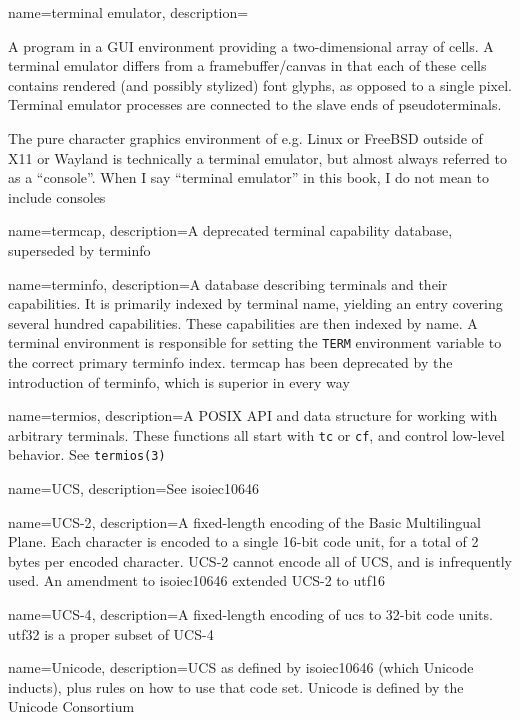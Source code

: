 {
  name={terminal emulator},
description={A program in a GUI environment providing a
  two-dimensional array of cells. A terminal emulator differs from a
  framebuffer/canvas in that each of these cells contains rendered (and
  possibly stylized) font glyphs, as opposed to a single pixel. Terminal
  emulator processes are connected to the slave ends of pseudoterminals.

 The pure character graphics environment of e.g. Linux or FreeBSD outside
  of X11 or Wayland is technically a terminal emulator, but almost always
  referred to as a ``console''. When I say ``terminal emulator'' in this book,
  I do not mean to include consoles}
}

{
  name={termcap},
description={A deprecated terminal capability database, superseded by \gls{terminfo}}
}

{
  name={terminfo},
description={A database describing terminals and their capabilities. It is
  primarily indexed by terminal name, yielding an entry covering several
  hundred capabilities. These capabilities are then indexed by name. A
  terminal environment is responsible for setting the \texttt{TERM} environment
  variable to the correct primary terminfo index. termcap has been
  deprecated by the introduction of terminfo, which is superior in every way}
}

{
  name={termios},
description={A POSIX API and data structure for working with arbitrary terminals.
  These functions all start with \texttt{tc} or \texttt{cf}, and control
  low-level behavior. See \texttt{termios(3)}\cite{termios}}
}

{
  name={UCS},
  description={See \Gls{isoiec10646}}
}

{
  name={UCS-2},
description={A fixed-length encoding of the Basic Multilingual Plane. Each
  character is encoded to a single 16-bit code unit, for a total of 2 bytes
  per encoded character. UCS-2 cannot encode all of UCS, and is infrequently
  used. An amendment to \Gls{isoiec10646} extended UCS-2 to \Gls{utf16}}
}

{
  name={UCS-4},
description={A fixed-length encoding of \Gls{ucs} to 32-bit code units.
  \Gls{utf32} is a proper subset of UCS-4\cite{rfc3629}}
}

{
  name={Unicode},
description={UCS as defined by \Gls{isoiec10646} (which Unicode inducts), plus
  rules on how to use that code set. Unicode is defined by the Unicode
  Consortium}
}


